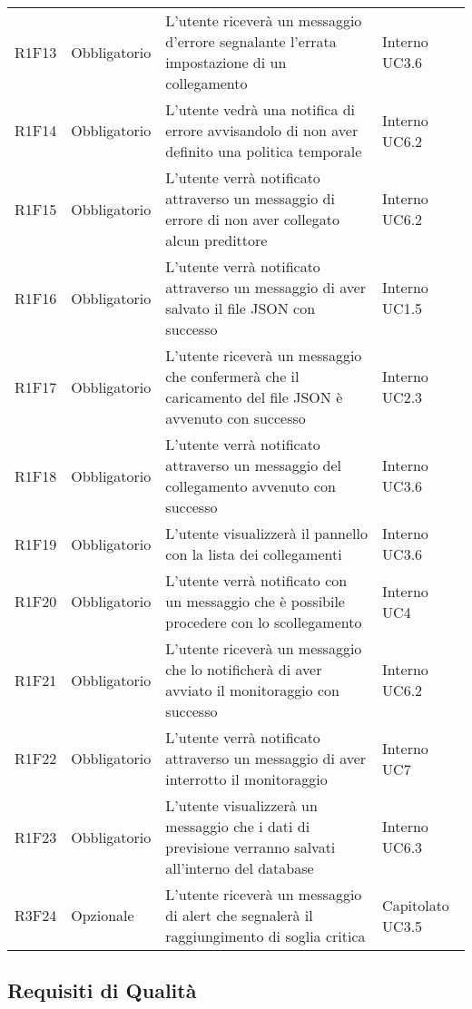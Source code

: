 \begin{longtable}{C{3cm} C{3cm} L{5.5cm} C{3cm}}
R1F13 & Obbligatorio & 
L’utente riceverà un messaggio d’errore segnalante l’errata impostazione di un collegamento & Interno UC3.6\\
R1F14 & Obbligatorio & L’utente vedrà una notifica di errore avvisandolo di non aver definito una politica temporale &  Interno UC6.2\\
R1F15 & Obbligatorio & L’utente verrà notificato attraverso un messaggio di errore di non aver collegato alcun predittore  &  Interno
UC6.2\\
R1F16 & Obbligatorio & L’utente verrà notificato attraverso un messaggio di aver salvato il file JSON con successo  & Interno UC1.5\\
R1F17 & Obbligatorio & L’utente riceverà un messaggio che confermerà che il caricamento del file JSON è avvenuto con successo &  Interno UC2.3\\
R1F18 & Obbligatorio & L’utente verrà notificato attraverso un messaggio del collegamento avvenuto con successo &  Interno
UC3.6\\
R1F19 & Obbligatorio & L’utente visualizzerà il pannello con la lista dei collegamenti & Interno UC3.6\\
R1F20 & Obbligatorio & L’utente verrà notificato con un messaggio che è possibile procedere con lo scollegamento &  Interno UC4\\
R1F21 & Obbligatorio & L’utente riceverà un messaggio che lo notificherà di aver avviato il monitoraggio con successo  & Interno UC6.2\\
R1F22 & Obbligatorio & L’utente verrà notificato attraverso un messaggio di aver interrotto il monitoraggio &  Interno UC7\\
R1F23 & Obbligatorio & L’utente visualizzerà un messaggio che i dati di previsione verranno salvati all’interno del database & Interno UC6.3\\
R3F24 & Opzionale & L’utente riceverà un messaggio di alert che segnalerà il raggiungimento di soglia critica & Capitolato UC3.5\\
\end{longtable}


\pagebreak
 	\subsection{Requisiti di Qualità}


